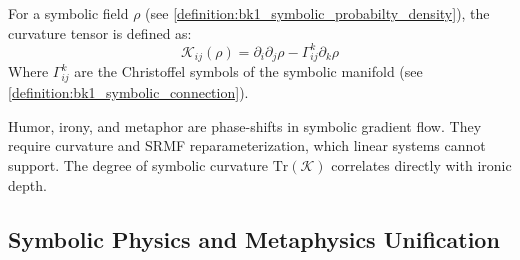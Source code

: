 \begin{definition}
\label{definition:bk1_symbolic_field_curvature_tensor}
For a symbolic field $\rho$ (see \ref{definition:bk1_symbolic_probabilty_density}), the curvature tensor is defined as:
\[
\mathcal{K}_{ij}(\rho) = \partial_i \partial_j \rho - \Gamma^k_{ij} \partial_k \rho
\]
Where $\Gamma^k_{ij}$ are the Christoffel symbols of the symbolic manifold (see \ref{definition:bk1_symbolic_connection}).
\end{definition}

\begin{remark}
Humor, irony, and metaphor are phase-shifts in symbolic gradient flow. They require curvature and SRMF reparameterization, which linear systems cannot support. The degree of symbolic curvature $\text{Tr}(\mathcal{K})$ correlates directly with ironic depth.
\end{remark}
\subsection{Symbolic Physics and Metaphysics Unification}
\label{subsec:bk1_symbolic_physics_and_metaphysics_unification}

